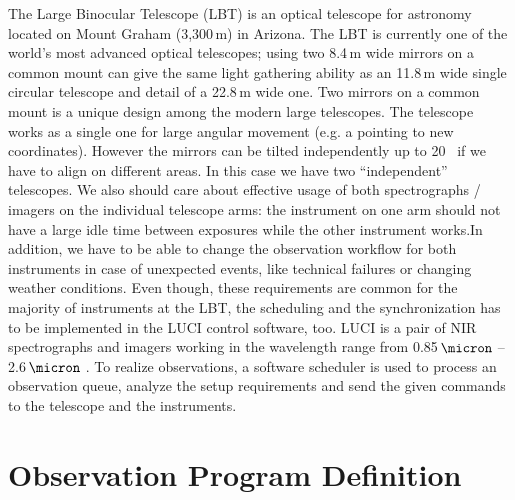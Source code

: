The Large Binocular Telescope (LBT) is an optical telescope for astronomy located on Mount Graham (3,300\,m) in Arizona. The LBT is currently one of the world's most advanced optical telescopes; using two 8.4\,m wide mirrors on a common mount can give the same light gathering ability as an 11.8\,m wide single circular telescope and detail of a 22.8\,m wide one. Two mirrors on a common mount is a unique design among the modern large telescopes. The telescope works as a single one for large angular movement (e.g. a pointing to new coordinates). However the mirrors can be tilted independently up to 20\arcsec~ if we have to align on different areas. In this case we have two ``independent'' telescopes. We also should care about effective usage of both spectrographs / imagers on the individual telescope arms: the instrument on one arm should not have a large idle time between exposures while the other instrument works.In addition, we have to be able to change the observation workflow for both instruments in case of unexpected events, like technical failures or changing weather conditions. Even though, these requirements are common for the majority of instruments at the LBT, the scheduling and the synchronization has to be implemented in the LUCI control software, too. LUCI is a pair of NIR spectrographs and imagers working in the wavelength range from 0.85\,$\micron$ -- 2.6\,$\micron$ \citep{2003SPIE.4841..962S,polsterer:2011}. To realize observations, a software scheduler is used to process an observation queue, analyze the setup requirements and send the given commands to the telescope and the instruments. 

\section{Observation Program Definition}

